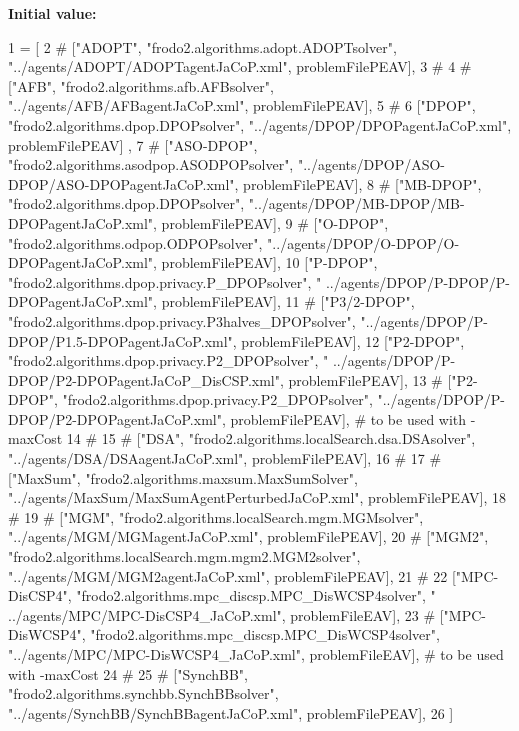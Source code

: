{\bfseries Initial value\+:}
\begin{DoxyCode}
1 =  [
2 \textcolor{comment}{#        ["ADOPT", "frodo2.algorithms.adopt.ADOPTsolver", "../agents/ADOPT/ADOPTagentJaCoP.xml",
       problemFilePEAV], }
3 \textcolor{comment}{# }
4 \textcolor{comment}{#        ["AFB", "frodo2.algorithms.afb.AFBsolver", "../agents/AFB/AFBagentJaCoP.xml", problemFilePEAV], }
5 \textcolor{comment}{# }
6         [\textcolor{stringliteral}{"DPOP"}, \textcolor{stringliteral}{"frodo2.algorithms.dpop.DPOPsolver"}, \textcolor{stringliteral}{"../agents/DPOP/DPOPagentJaCoP.xml"}, problemFilePEAV]
      , 
7 \textcolor{comment}{#        ["ASO-DPOP", "frodo2.algorithms.asodpop.ASODPOPsolver",
       "../agents/DPOP/ASO-DPOP/ASO-DPOPagentJaCoP.xml", problemFilePEAV], }
8 \textcolor{comment}{#        ["MB-DPOP", "frodo2.algorithms.dpop.DPOPsolver", "../agents/DPOP/MB-DPOP/MB-DPOPagentJaCoP.xml",
       problemFilePEAV], }
9 \textcolor{comment}{#         ["O-DPOP", "frodo2.algorithms.odpop.ODPOPsolver", "../agents/DPOP/O-DPOP/O-DPOPagentJaCoP.xml",
       problemFilePEAV], }
10         [\textcolor{stringliteral}{"P-DPOP"}, \textcolor{stringliteral}{"frodo2.algorithms.dpop.privacy.P\_DPOPsolver"}, \textcolor{stringliteral}{"
      ../agents/DPOP/P-DPOP/P-DPOPagentJaCoP.xml"}, problemFilePEAV], 
11 \textcolor{comment}{#         ["P3/2-DPOP", "frodo2.algorithms.dpop.privacy.P3halves\_DPOPsolver",
       "../agents/DPOP/P-DPOP/P1.5-DPOPagentJaCoP.xml", problemFilePEAV], }
12         [\textcolor{stringliteral}{"P2-DPOP"}, \textcolor{stringliteral}{"frodo2.algorithms.dpop.privacy.P2\_DPOPsolver"}, \textcolor{stringliteral}{"
      ../agents/DPOP/P-DPOP/P2-DPOPagentJaCoP\_DisCSP.xml"}, problemFilePEAV], 
13 \textcolor{comment}{#        ["P2-DPOP", "frodo2.algorithms.dpop.privacy.P2\_DPOPsolver",
       "../agents/DPOP/P-DPOP/P2-DPOPagentJaCoP.xml", problemFilePEAV], # to be used with -maxCost}
14 \textcolor{comment}{# }
15 \textcolor{comment}{#        ["DSA", "frodo2.algorithms.localSearch.dsa.DSAsolver", "../agents/DSA/DSAagentJaCoP.xml",
       problemFilePEAV], }
16 \textcolor{comment}{# }
17 \textcolor{comment}{#        ["MaxSum", "frodo2.algorithms.maxsum.MaxSumSolver",
       "../agents/MaxSum/MaxSumAgentPerturbedJaCoP.xml", problemFilePEAV], }
18 \textcolor{comment}{# }
19 \textcolor{comment}{#        ["MGM", "frodo2.algorithms.localSearch.mgm.MGMsolver", "../agents/MGM/MGMagentJaCoP.xml",
       problemFilePEAV], }
20 \textcolor{comment}{#        ["MGM2", "frodo2.algorithms.localSearch.mgm.mgm2.MGM2solver", "../agents/MGM/MGM2agentJaCoP.xml",
       problemFilePEAV], }
21 \textcolor{comment}{# }
22         [\textcolor{stringliteral}{"MPC-DisCSP4"}, \textcolor{stringliteral}{"frodo2.algorithms.mpc\_discsp.MPC\_DisWCSP4solver"}, \textcolor{stringliteral}{"
      ../agents/MPC/MPC-DisCSP4\_JaCoP.xml"}, problemFileEAV], 
23 \textcolor{comment}{#        ["MPC-DisWCSP4", "frodo2.algorithms.mpc\_discsp.MPC\_DisWCSP4solver",
       "../agents/MPC/MPC-DisWCSP4\_JaCoP.xml", problemFileEAV], # to be used with -maxCost}
24 \textcolor{comment}{# }
25 \textcolor{comment}{#        ["SynchBB", "frodo2.algorithms.synchbb.SynchBBsolver", "../agents/SynchBB/SynchBBagentJaCoP.xml",
       problemFilePEAV], }
26         ]
\end{DoxyCode}
